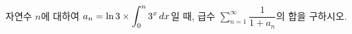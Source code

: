 자연수 $n$에 대하여 $a_n=\ln 3\times\displaystyle\int_{0}^{n}3^x\mkern3mu dx$일 때, 급수 $\displaystyle\sum_{n=1}^{\infty}\dfrac{1}{1+a_n}$의 합을 구하시오.
